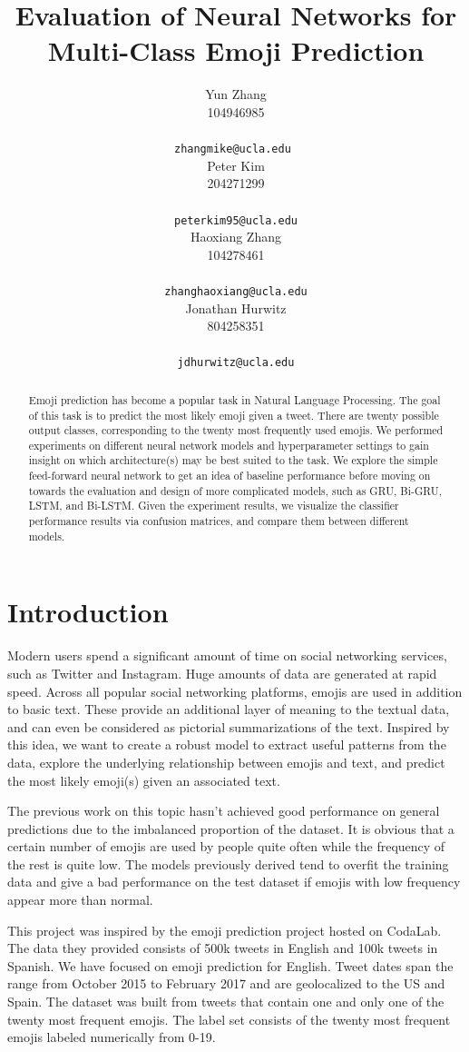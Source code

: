 \documentclass[11pt,a4paper]{article}
\title{Evaluation of Neural Networks for Multi-Class Emoji Prediction}
\author{Yun Zhang \\
	 104946985 \\
	 \\
	\small{\tt zhangmike@ucla.edu } \\\And
	Peter Kim \\
	204271299 \\
	 \\
	\small{\tt peterkim95@ucla.edu} \\\And
	Haoxiang Zhang \\
	104278461 \\
	 \\
	\small{\tt zhanghaoxiang@ucla.edu} \\\And
	 Jonathan Hurwitz \\
	 804258351 \\
	 \\
	\small{\tt jdhurwitz@ucla.edu} \\
}
\date{}
\begin{document}
	\maketitle
	\begin{abstract}
	Emoji prediction has become a popular task in Natural Language Processing. The goal of this task is to predict the most likely emoji given a tweet. There are twenty possible output classes, corresponding to the twenty most frequently used emojis. We performed experiments on different neural network models and hyperparameter settings to gain insight on which architecture(s) may be best suited to the task. We explore the simple feed-forward neural network to get an idea of baseline performance before moving on towards the evaluation and design of more complicated models, such as GRU, Bi-GRU, LSTM, and Bi-LSTM. Given the experiment results, we visualize the classifier performance results via confusion matrices, and compare them between different models.
	\end{abstract}
	
	\section{Introduction}
	
	Modern users spend a significant amount of time on social networking services, such as Twitter and Instagram. Huge amounts of data are generated at rapid speed. Across all popular social networking platforms, emojis are used in addition to basic text. These provide an additional layer of meaning to the textual data, and can even be considered as pictorial summarizations of the text. Inspired by this idea, we want to create a robust model to extract useful patterns from the data, explore the underlying relationship between emojis and text, and predict the most likely emoji(s) given an associated text.
	\par
	The previous work on this topic hasn’t achieved good performance on general predictions due to the imbalanced proportion of the dataset. It is obvious that a certain number of emojis are used by people quite often while the frequency of the rest is quite low. The models previously derived tend to overfit the training data and give a bad performance on the test dataset if emojis with low frequency appear more than normal.
	\par
	This project was inspired by the emoji prediction project hosted on CodaLab. The data they provided consists of 500k tweets in English and 100k tweets in Spanish. We have focused on emoji prediction for English. Tweet dates span the range from October 2015 to February 2017 and are geolocalized to the US and Spain. The dataset was built from tweets that contain one and only one of the twenty most frequent emojis. The label set consists of the twenty most frequent emojis labeled numerically from 0-19.
	
\end{document}
